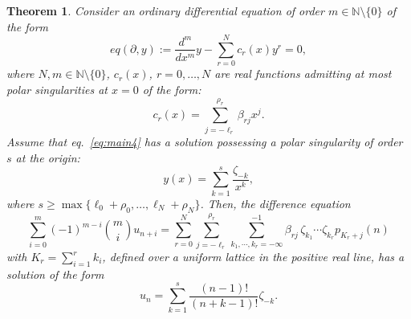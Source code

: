 \documentclass[10pt,a4paper]{amsart}
\newtheorem{theorem}{Theorem}
\begin{document}
\begin{theorem}
\label{main4}
Consider an ordinary differential equation of order
$m\in \mathbb{N}\setminus \{0\}$ of the form
\begin{equation}
\label{eq:main4}
eq(\partial , y):=\frac{d^{m}}{dx^{m}}y-\sum _{r=0}^{N} c_{r}(x) y^{r}=0,
\end{equation}
where $N, m\in \mathbb{N}\setminus \{0\}$, $c_{r}(x)$,
$r=0,\ldots ,N$ are real functions admitting at most polar singularities at
$x=0$ of the form:
\begin{equation}
c_{r}(x)=\sum _{j=-\ell _{r}}^{\rho _{r}}\beta _{rj} x^{j}.
\label{eq8.12}
\end{equation}
Assume that eq.~\eqref{eq:main4} has a solution possessing a polar singularity
of order $s$ at the origin:
\begin{equation}
\label{eq:npolsol}
y(x)= \sum _{k=1}^{s}\frac{\zeta _{-k}}{x^{k}},
\end{equation}
where
$s\geq \max \{\ell _{0}+\rho _{0},\ldots ,\ell _{N}+\rho _{N} \}$. Then,
the difference equation
\begin{equation}
\label{eq:8.14}
\sum _{i=0}^{m}(-1)^{m-i}\binom{m}{i}u_{n+i}=\sum _{r=0}^{N} \sum _{j=-
\ell _{r}}^{\rho _{r}} \sum _{k_{1},\cdots ,k_{r}=-\infty}^{-1}
\beta _{rj} \, \zeta _{k_{1}}\cdots \zeta _{k_{r}}p_{K_r+j}(n)
\end{equation}
with $K_{r}=\sum _{i=1}^{r} k_{i}$, defined over a uniform lattice in the positive real line, has a
solution of the form
\begin{equation}
\label{eq:8.15}
u_{n}=\sum _{k=1}^{s}\frac{(n-1)!}{(n+k-1)!}\zeta _{-k}.
\end{equation}
\end{theorem}
\end{document}
